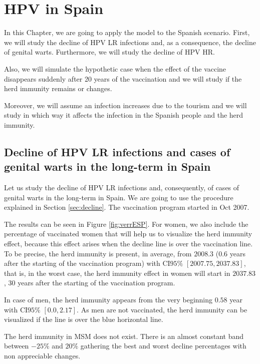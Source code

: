 \chapter{HPV in Spain}\label{HPVSpain}
In this Chapter, we are going to apply the model to the Spanish scenario. First, we will study the decline of HPV LR infections and, as a consequence, the decline of genital warts. Furthermore, we will study the decline of HPV HR.

Also, we will simulate the hypothetic case when the effect of the vaccine disappears suddenly after 20 years of the vaccination and we will study if the herd immunity remains or changes. 

Moreover, we will assume an infection increases due to the tourism and we will study in which way it affects the infection in the Spanish people and the herd immunity. 

\section{Decline of HPV LR infections and cases of genital warts in the long-term in Spain}
Let us study the decline of HPV LR infections and, consequently, of cases of genital warts in the long-term in Spain. We are going to use the procedure explained in Section \ref{sec:decline}. The vaccination program started in Oct 2007.

The results can be seen in Figure \ref{fig:verrESP}. For women, we also include the percentage of vaccinated women that will help us to visualize the herd immunity effect, because this effect arises when the decline line is over the vaccination line. To be precise, the herd immunity is present, in average, from $2008.3$ ($0.6$ years after the starting of the vaccination program) with CI$95\%$ $[2007.75, 2037.83]$, that is, in the worst case, the herd immunity effect in women will start in $2037.83$, $30$ years after the starting of the vaccination program. 

In case of men, the herd immunity appears from the very beginning $0.58$ year with CI$95\%$ $[0.0, 2.17]$. As men are not vaccinated, the herd immunity can be visualized if the line is over the blue horizontal line. 

The herd immunity in MSM does not exist. There is an almost constant band between $-25\%$ and $20\%$ gathering the best and worst decline percentages with non appreciable changes.

